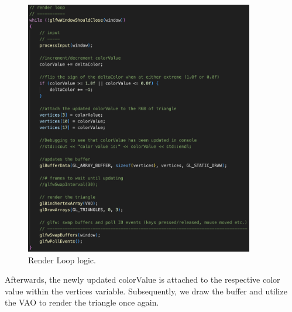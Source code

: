 \begin{figure}[htb]
    \centering
    \includegraphics[width=10cm]{./Images/Render_Loop.png}
       \caption{Render Loop logic.}
           \label{Fig:renderloop}
\end{figure}

Afterwards, the newly updated colorValue is attached to the respective color value within the vertices variable.
Subsequently, we draw the buffer and utilize the VAO to render the triangle once again.

\newpage